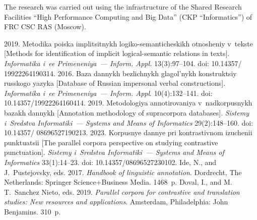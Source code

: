  
     \Ack
     
     \vspace*{-2pt}
     
\noindent
The research was carried out using the infrastructure of the Shared Research Facilities ``High 
Performance Computing and Big Data'' (CKP ``Informatics'') of FRC CSC RAS (Moscow). 
  


  \begin{multicols}{2}

\renewcommand{\bibname}{\protect\rmfamily References}

{\small\frenchspacing
 {%
 \begin{thebibliography}{99} 
 2019. Me\-to\-di\-ka po\-iska imp\-li\-tsit\-nykh  
logiko-semanticheskikh ot\-no\-she\-niy v~teks\-te [Methods for identification of implicit logical-semantic 
relations in texts]. \textit{Informatika i~ee Primeneniya~--- Inform. Appl.} 13(3):97--104. 
doi: 10.14357/ 19922264190314.
 2016. Baza dan\-nykh bez\-lich\-nykh  
gla\-gol'\-nykh kon\-struk\-tsiy rus\-sko\-go yazy\-ka [Database of Russian impersonal verbal 
constructions]. \textit{Informatika i~ee Primeneniya~--- Inform. Appl}. 10(4):132--141. doi: 
10.14357/19922264160414.
 2019. Me\-to\-do\-lo\-giya  
an\-no\-ti\-ro\-va\-niya v~nad\-kor\-pus\-nykh ba\-zakh dan\-nykh [Annotation methodology of 
\mbox{supracorpora} databases]. \textit{Sistemy i~Sredstva Informatiki~--- Systems and Means of Informatics} 
29(2):148--160. doi: 10.14357/ 08696527190213.
 2023. Korpusnye dannye pri kontrastivnom izuchenii 
punktuatsii [The parallel corpora perspective on studying contrastive punctuation]. \textit{Sis\-te\-my 
i~Sredstva Informatiki~--- Systems and Means of Informatics} 33(1):14--23. doi: 
10.14357/08696527230102.
Ide, N., and J.~Pustejovsky, eds. 2017. \textit{Handbook of linguistic annotation}. Dordrecht, The 
Netherlands: Springer Science\;+\;Business Media. 1468~p.
Doval, I., and M.\,T.~Sanchez Nieto, eds. 2019. \textit{Parallel corpora for contrastive and translation 
studies: New resources and applications}. Amsterdam, Philadelphia: John Benjamins. 310~p.

\end{thebibliography}}}
\end{multicols}
